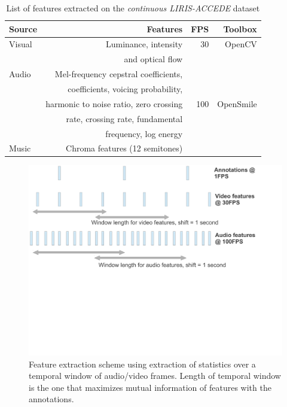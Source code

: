\documentclass{article}
\begin{document}
\begin{spacing}{0.9}
\begin{table}[t]
\centering
\caption{List of features extracted on the {\it continuous LIRIS-ACCEDE} dataset}
\begin{tabular}{@{}l@{}|r|r|r@{}}\hline
{\bf Source} &{\bf Features} & {\bf FPS} & {\bf Toolbox} \\ \hline
Visual & Luminance, intensity & 30 & OpenCV \\ 
       & and optical flow & & \cite{bradski2008learning} \\ \hline
Audio & Mel-frequency cepstral coefficients,& & \\
               & coefficients, voicing probability, & & \\  
               & harmonic to noise ratio, zero crossing & 100 & OpenSmile \\  
               & rate, crossing rate, fundamental & &\cite{eyben2010opensmile} \\  
               & frequency, log energy & & \\ \cline{1-2}
Music & Chroma features (12 semitones) & & \\ 
\end{tabular}
\vspace{-4mm}
\label{table:features}
\end{table}


\begin{figure}[t]
\centering
\includegraphics [trim=0cm 9cm 3cm 0cm,clip=true,scale=.35] {images/features_fig.pdf} 
\vspace{-10mm}
\caption{Feature extraction scheme using extraction of statistics over a temporal window of audio/video frames. Length of temporal window is the one that maximizes mutual information of features with the annotations.}
\vspace{-5mm}
\label{feat_fig}
\end{figure}



\end{spacing}
\end{document}
